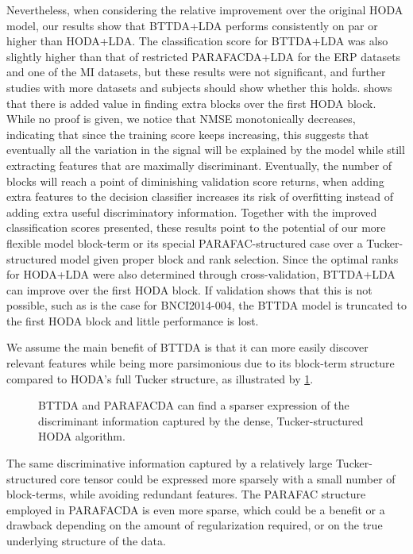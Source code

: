 Nevertheless, when considering the relative improvement over the original
HODA model, our results show that BTTDA+LDA performs consistently on par or higher than HODA+LDA.
The classification score for BTTDA+LDA was also slightly higher than that of
restricted PARAFACDA+LDA for the ERP datasets and one of the MI datasets, but these
results were not significant, and further studies with more datasets and
subjects should show whether this holds.
 shows that there is added value in finding extra blocks
over the first HODA block.
While no proof is given, we notice that NMSE monotonically decreases, indicating that
since the training score keeps increasing, this suggests that
eventually all the variation in the signal will be explained by the model
while still extracting features that are maximally discriminant.
Eventually, the number of blocks will reach a point of diminishing validation
score returns, when adding extra features to the decision classifier increases
its risk of overfitting instead of adding extra useful discriminatory
information.
Together with the improved classification scores presented, these results
point to the potential of our more flexible model block-term or
its special PARAFAC-structured case over a Tucker-structured model given proper block and
rank selection.
Since the optimal ranks for HODA+LDA were also determined through
cross-validation, BTTDA+LDA can improve over the first HODA block.
If validation shows that this is not possible, such as is the case for
BNCI2014-004, the BTTDA model is truncated to the first HODA block and little
performance is lost.

We assume the main benefit of BTTDA is that it can more easily discover relevant
features while
being more parsimonious due to its block-term structure compared to HODA's full
Tucker structure, as illustrated by \cref{fig:bttda/sparse}.
\begin{figure}
  
  \caption[Sparsity of BTTDA and PARAFACDA]{BTTDA and PARAFACDA can find a
  sparser expression of the discriminant information captured by the dense,
  Tucker-structured HODA algorithm.}
  \label{fig:bttda/sparse}
\end{figure}
The same discriminative information captured by a relatively large
Tucker-structured core tensor could be expressed more sparsely with a small
number of block-terms, while avoiding redundant features.
The PARAFAC structure employed in PARAFACDA is even more sparse, which could be
a benefit or a drawback depending on the amount of regularization required,
or on the true underlying structure of the data.

